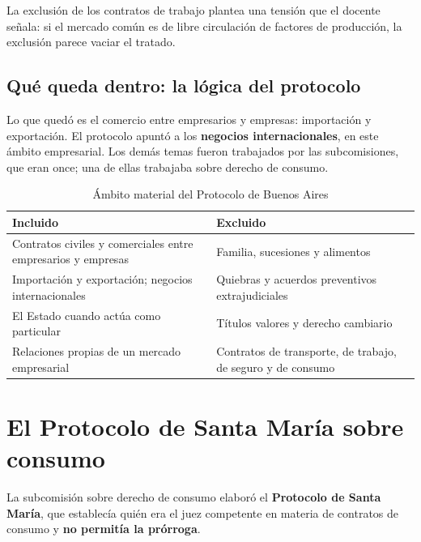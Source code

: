 \documentclass[12pt,oneside]{book}
\begin{document}
\begin{note}
La exclusión de los contratos de trabajo plantea una tensión que el docente señala: si el mercado común es de libre circulación de factores de producción, la exclusión parece vaciar el tratado.
\end{note}


\subsection{Qué queda dentro: la lógica del protocolo}

Lo que quedó es el comercio entre empresarios y empresas: importación y exportación. El protocolo apuntó a los \textbf{negocios internacionales}, en este ámbito empresarial. Los demás temas fueron trabajados por las subcomisiones, que eran once; una de ellas trabajaba sobre derecho de consumo.

\begin{table}[H]
\centering
\caption{Ámbito material del Protocolo de Buenos Aires}
\small
\begin{tabularx}{\textwidth}{YY}
\toprule
\textbf{Incluido} & \textbf{Excluido} \\
\midrule
Contratos civiles y comerciales entre empresarios y empresas & Familia, sucesiones y alimentos \\
Importación y exportación; negocios internacionales & Quiebras y acuerdos preventivos extrajudiciales \\
El Estado cuando actúa como particular & Títulos valores y derecho cambiario \\
Relaciones propias de un mercado empresarial & Contratos de transporte, de trabajo, de seguro y de consumo \\
\bottomrule
\end{tabularx}
\end{table}

\section{El Protocolo de Santa María sobre consumo}

La subcomisión sobre derecho de consumo elaboró el \textbf{Protocolo de Santa María}, que establecía quién era el juez competente en materia de contratos de consumo y \textbf{no permitía la prórroga}.
\end{document}
